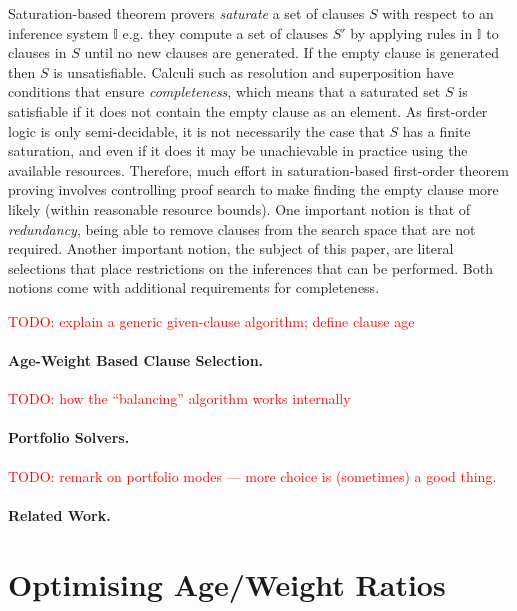 \documentclass{llncs}
\newcommand{\todo}[1]{\textcolor{red}{TODO: #1}}
\begin{document}
Saturation-based theorem provers \emph{saturate} a set of clauses $S$ with respect to an inference system $\mathbb{I}$ e.g. they compute a set of clauses $S'$ by applying rules in $\mathbb{I}$ to clauses in $S$ until no new clauses are generated. 
%
If the empty clause is generated then $S$ is unsatisfiable.
%
Calculi such as resolution and superposition have conditions that ensure \emph{completeness}, which means that a saturated set $S$ is satisfiable if it does not contain the empty clause as an element.
%
As first-order logic is only semi-decidable, it is not necessarily the case that $S$ has a finite saturation, and even if it does it may be unachievable in practice using the available resources. 
%
Therefore, much effort in saturation-based first-order theorem proving involves 
controlling proof search to make finding the empty clause more likely (within reasonable resource bounds). 
%
One important notion is that of \emph{redundancy}, being able to remove clauses from the search space that are not required. 
%
Another important notion, the subject of this paper, are literal selections that place restrictions on the inferences that can be performed. 
%
Both notions come with additional requirements for completeness.

\todo{explain a generic given-clause algorithm; define clause age}

\paragraph{Age-Weight Based Clause Selection.}

\todo{ how the ``balancing'' algorithm works internally}

\paragraph{Portfolio Solvers.}

\todo{remark on portfolio modes --- more choice is (sometimes) a good thing}.

\paragraph{Related Work.}

\section{Optimising Age/Weight Ratios}
\end{document}
